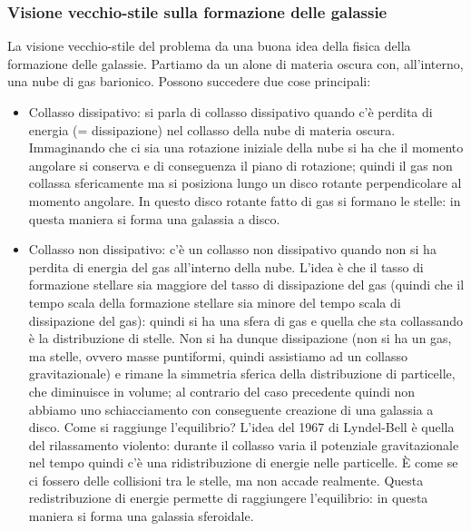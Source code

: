 \subsubsection{Visione vecchio-stile sulla formazione delle galassie}
La visione vecchio-stile del problema da una buona idea della fisica della formazione delle galassie. Partiamo da un alone di materia oscura con, all’interno, una nube di gas barionico. Possono succedere due cose principali:
\begin{itemize}
    \item  Collasso dissipativo: si parla di collasso dissipativo quando c’è perdita di energia (= dissipazione) nel collasso della nube di materia oscura. Immaginando che ci sia una rotazione iniziale della nube si ha che il momento angolare si conserva e di conseguenza il piano di rotazione; quindi il gas non collassa sfericamente ma si posiziona lungo un disco rotante perpendicolare al momento angolare. In questo disco rotante fatto di gas si formano le stelle: in questa maniera si forma una galassia a disco.
    \item Collasso non dissipativo: c’è un collasso non dissipativo quando non si ha perdita di energia del gas all'interno della nube. L’idea è che il tasso di formazione stellare sia maggiore del tasso di dissipazione del gas (quindi che il tempo scala della formazione stellare sia minore del tempo scala di dissipazione del gas): quindi si ha una sfera di gas e quella che sta collassando è la distribuzione di stelle. Non si ha dunque dissipazione (non si ha un gas, ma stelle, ovvero masse puntiformi, quindi assistiamo ad un collasso gravitazionale) e rimane la simmetria sferica della distribuzione di particelle, che diminuisce in volume; al contrario del caso precedente quindi non abbiamo uno schiacciamento con conseguente creazione di una galassia a disco. Come si raggiunge l’equilibrio? L’idea del 1967 di Lyndel-Bell è quella del rilassamento  violento: durante il collasso varia il potenziale gravitazionale nel tempo quindi c’è una ridistribuzione di energie nelle particelle. È come se ci fossero delle collisioni tra le stelle, ma non accade realmente. Questa redistribuzione di energie permette di raggiungere l’equilibrio: in questa maniera si forma una galassia sferoidale.
\end{itemize}

